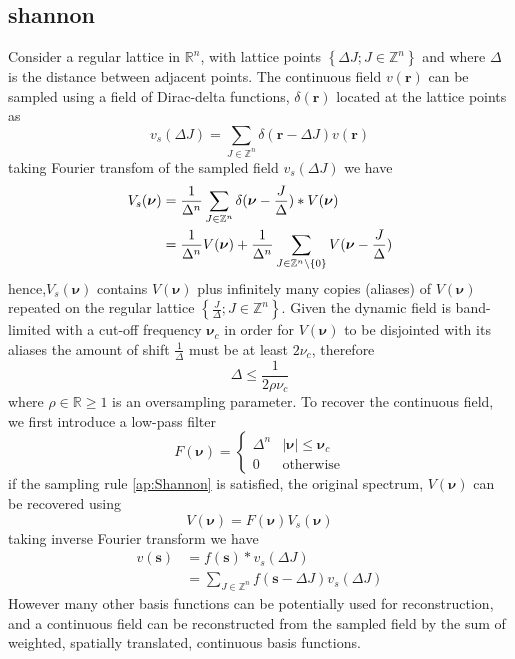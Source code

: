 \documentclass[]{article}
\begin{document}
\subsection*{shannon}
Consider a regular lattice in $\mathbb R^n$, with lattice points $\left\lbrace \Delta J; J\in \mathbb Z^n\right\rbrace$ and where $\Delta$ is the distance between adjacent points. The continuous field $v(\mathbf r)$ can be sampled using a field of Dirac-delta functions, $\delta(\mathbf r)$ located at the lattice points as
\begin{equation}
 v_s(\Delta J)=\sum_{J \in \mathbb Z^n}\delta(\mathbf r-\Delta J)v(\mathbf r)
\end{equation}
taking Fourier transfom of the sampled field $v_s(\Delta J)$ we have
\begin{align}
 V_s(\boldsymbol{\nu})&=\frac{1}{\Delta^n}\sum_{J\in\mathbb Z^n}\delta(\boldsymbol{\nu}-\frac{J}{\Delta})\ast V(\boldsymbol\nu)\\
&=\frac{1}{\Delta^n}V(\boldsymbol\nu)+\frac{1}{\Delta^n}\sum_{J\in\mathbb Z^n\setminus \mathbf \{0\}}V(\boldsymbol{\nu}-\frac{J}{\Delta})
\end{align}
hence,$V_s(\boldsymbol{\nu})$ contains $V(\boldsymbol\nu)$ plus infinitely many copies (aliases) of  $V(\boldsymbol\nu)$ repeated on the regular lattice $\left\lbrace \frac{J}{\Delta}; J\in \mathbb Z^n\right\rbrace$. Given the dynamic field is band-limited with a cut-off frequency $\boldsymbol\nu_c$ in order for $V(\boldsymbol\nu)$ to be disjointed with its aliases the amount of shift $\frac{1}{\Delta}$ must be at least $2\nu_c$, therefore
\begin{equation}\label{ap:Shannon}
 \Delta\le\frac{1}{2\rho\nu_c}
\end{equation}
where $\rho \in \mathbb{R} \ge 1$ is an oversampling parameter. To recover the continuous field, we first introduce a low-pass filter \begin{equation}
F(\boldsymbol \nu)=\begin{cases}
  \Delta^n & |\boldsymbol\nu|\le \boldsymbol\nu_c \\
  0 & \text{otherwise}
\end{cases} 
\end{equation}
if the sampling rule \eqref{ap:Shannon} is satisfied, the original spectrum, $V(\boldsymbol\nu)$ can be recovered using
\begin{equation}
 V(\boldsymbol\nu)=F(\boldsymbol \nu)V_s(\boldsymbol\nu)
\end{equation}
taking inverse Fourier transform we have
\begin{align}
v(\mathbf s)&=f(\mathbf s)\ast v_s(\Delta J) \\
&=\sum_{J \in \mathbb Z^n}f(\mathbf s-\Delta J) v_s(\Delta J)
\end{align}
However many other basis functions can be potentially used for reconstruction, and a continuous field can be reconstructed from the sampled field by the sum of weighted, spatially translated, continuous  basis functions.
\end{document}
